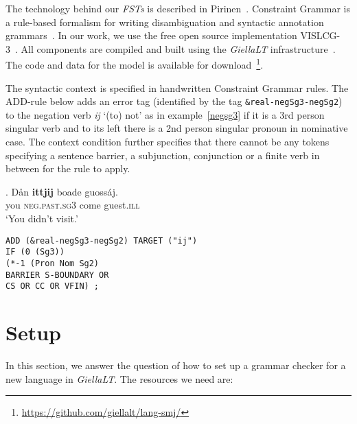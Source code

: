 \documentclass[free]{flammie}
\begin{document}
The technology behind our \textit{FSTs} is described in
Pirinen~\cite{Pirinen2014state}.  Constraint Grammar is a rule-based formalism for
writing disambiguation and syntactic annotation
grammars~\cite{Karlsson1990constraint,Karlsson1995constraint}.  In our work, we
use the free open source implementation VISLCG-3~\cite{bick2015cg}. All
components are compiled and built using the \textit{GiellaLT}
infrastructure~\cite{Moshagen-etal-2013-Building}.  The code and data for the
model is available for
download~\footnote{\url{https://github.com/giellalt/lang-smj/}}.

The syntactic context is specified in handwritten Constraint Grammar rules. The
ADD-rule below adds an error tag (identified by the tag
\texttt{\&real-negSg3-negSg2}) to the negation verb \textit{ij} `(to) not' as in
example~\ref{negsg3} if it is a 3rd person singular verb and to its left there
is a 2nd person singular pronoun in nominative case. The context condition
further specifies that there cannot be any tokens specifying a sentence barrier,
a subjunction, conjunction or a finite verb in between for the rule to apply.

\exg. Dån \textbf{ittjij} boade guossáj.\label{negsg3}\\
you \textsc{neg.past.sg3} come guest\textsc{.ill}\\
`You didn't visit.'

\begin{Verbatim}[frame=single,framerule=0.2mm,framesep=3mm,fontsize=\footnotesize,baselinestretch=1]
ADD (&real-negSg3-negSg2) TARGET ("ij")
IF (0 (Sg3))
(*-1 (Pron Nom Sg2)
BARRIER S-BOUNDARY OR
CS OR CC OR VFIN) ;
\end{Verbatim}

\section{Setup}

In this section, we answer the question of how to set up a grammar checker for a
new language in \textit{GiellaLT}. The resources we need are:
\end{document}
